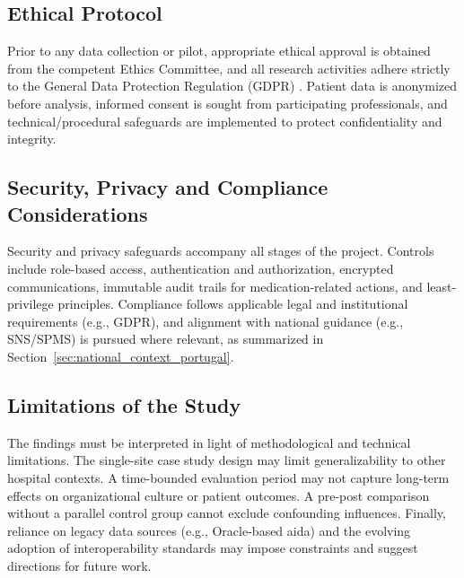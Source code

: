 \subsection{Ethical Protocol}
Prior to any data collection or pilot, appropriate ethical approval is obtained from the competent Ethics Committee, and all research activities adhere strictly to the General Data Protection Regulation (GDPR) \cite{european2016}. Patient data is anonymized before analysis, informed consent is sought from participating professionals, and technical/procedural safeguards are implemented to protect confidentiality and integrity.

\subsection{Security, Privacy and Compliance Considerations}
Security and privacy safeguards accompany all stages of the project. Controls include role-based access, authentication and authorization, encrypted communications, immutable audit trails for medication-related actions, and least-privilege principles. Compliance follows applicable legal and institutional requirements (e.g., GDPR), and alignment with national guidance (e.g., SNS/SPMS) is pursued where relevant, as summarized in Section~\ref{sec:national_context_portugal}.

\subsection{Limitations of the Study}
The findings must be interpreted in light of methodological and technical limitations. The single-site case study design may limit generalizability to other hospital contexts. A time-bounded evaluation period may not capture long-term effects on organizational culture or patient outcomes. A pre-post comparison without a parallel control group cannot exclude confounding influences. Finally, reliance on legacy data sources (e.g., Oracle-based \gls{aida}) and the evolving adoption of interoperability standards may impose constraints and suggest directions for future work.


